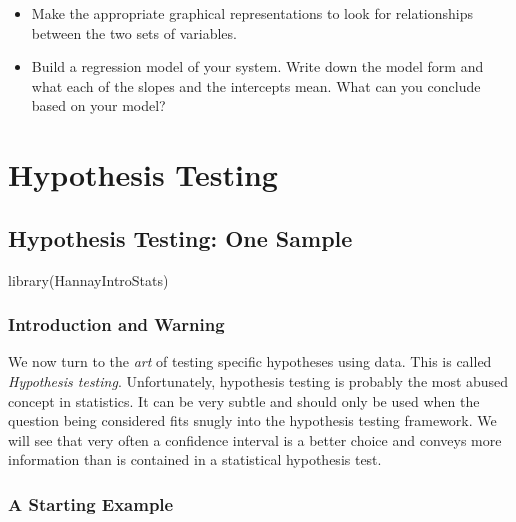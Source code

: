 \documentclass[
]{book}
\newenvironment{Shaded}{\begin{snugshade}}{\end{snugshade}}
\newcommand{\FunctionTok}[1]{\textcolor[rgb]{0.00,0.00,0.00}{#1}}
\newcommand{\NormalTok}[1]{#1}
\providecommand{\tightlist}{%
  \setlength{\itemsep}{0pt}\setlength{\parskip}{0pt}}
\theoremstyle{definition}
\theoremstyle{definition}
\theoremstyle{definition}
\theoremstyle{definition}
\theoremstyle{remark}
\begin{document}
\begin{enumerate}
  \begin{itemize}
  \tightlist
  \item
    Make the appropriate graphical representations to look for relationships between the two sets of variables.
  \item
    Build a regression model of your system. Write down the model form and what each of the slopes and the intercepts mean. What can you conclude based on your model?
  \end{itemize}
\end{enumerate}

\hypertarget{part-hypothesis-testing}{%
\part{Hypothesis Testing}\label{part-hypothesis-testing}}

\hypertarget{hypothesis-testing-one-sample}{%
\chapter{Hypothesis Testing: One Sample}\label{hypothesis-testing-one-sample}}

\begin{Shaded}
\begin{Highlighting}[]
\FunctionTok{library}\NormalTok{(HannayIntroStats)}
\end{Highlighting}
\end{Shaded}

\hypertarget{introduction-and-warning}{%
\section{Introduction and Warning}\label{introduction-and-warning}}

We now turn to the \emph{art} of testing specific hypotheses using data. This is called \emph{Hypothesis testing}. Unfortunately, hypothesis testing is probably the most abused concept in statistics. It can be very subtle and should only be used when the question being considered fits snugly into the hypothesis testing framework. We will see that very often a confidence interval is a better choice and conveys more information than is contained in a statistical hypothesis test.

\hypertarget{a-starting-example}{%
\section{A Starting Example}\label{a-starting-example}}
\end{document}
